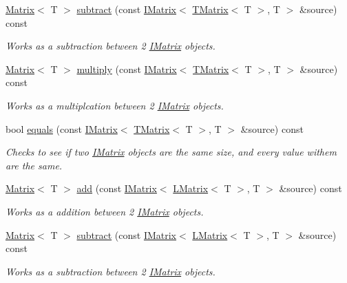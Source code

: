 \begin{DoxyCompactItemize}
\mbox{\hyperlink{class_matrix}{Matrix}}$<$ T $>$ \mbox{\hyperlink{class_l_matrix_ab86a9c648460e127961b32c5dd18b7b2}{subtract}} (const \mbox{\hyperlink{class_i_matrix}{I\+Matrix}}$<$ \mbox{\hyperlink{class_t_matrix}{T\+Matrix}}$<$ T $>$, T $>$ \&source) const
\begin{DoxyCompactList}\small\item\em Works as a subtraction between 2 \mbox{\hyperlink{class_i_matrix}{I\+Matrix}} objects. \end{DoxyCompactList}\item 
\mbox{\hyperlink{class_matrix}{Matrix}}$<$ T $>$ \mbox{\hyperlink{class_l_matrix_aedac07d7a0deffd244b12b598efe2e1d}{multiply}} (const \mbox{\hyperlink{class_i_matrix}{I\+Matrix}}$<$ \mbox{\hyperlink{class_t_matrix}{T\+Matrix}}$<$ T $>$, T $>$ \&source) const
\begin{DoxyCompactList}\small\item\em Works as a multiplcation between 2 \mbox{\hyperlink{class_i_matrix}{I\+Matrix}} objects. \end{DoxyCompactList}\item 
bool \mbox{\hyperlink{class_l_matrix_a4cd960c8bd0a7683a970f93fe4b29de5}{equals}} (const \mbox{\hyperlink{class_i_matrix}{I\+Matrix}}$<$ \mbox{\hyperlink{class_t_matrix}{T\+Matrix}}$<$ T $>$, T $>$ \&source) const
\begin{DoxyCompactList}\small\item\em Checks to see if two \mbox{\hyperlink{class_i_matrix}{I\+Matrix}} objects are the same size, and every value withem are the same. \end{DoxyCompactList}\item 
\mbox{\hyperlink{class_matrix}{Matrix}}$<$ T $>$ \mbox{\hyperlink{class_l_matrix_a18418777c3d498210d3a9c019583d0b9}{add}} (const \mbox{\hyperlink{class_i_matrix}{I\+Matrix}}$<$ \mbox{\hyperlink{class_l_matrix}{L\+Matrix}}$<$ T $>$, T $>$ \&source) const
\begin{DoxyCompactList}\small\item\em Works as a addition between 2 \mbox{\hyperlink{class_i_matrix}{I\+Matrix}} objects. \end{DoxyCompactList}\item 
\mbox{\hyperlink{class_matrix}{Matrix}}$<$ T $>$ \mbox{\hyperlink{class_l_matrix_af215feeb6856f0dbe4800f8071c6013c}{subtract}} (const \mbox{\hyperlink{class_i_matrix}{I\+Matrix}}$<$ \mbox{\hyperlink{class_l_matrix}{L\+Matrix}}$<$ T $>$, T $>$ \&source) const
\begin{DoxyCompactList}\small\item\em Works as a subtraction between 2 \mbox{\hyperlink{class_i_matrix}{I\+Matrix}} objects. \end{DoxyCompactList}\item 

\end{DoxyCompactItemize}
